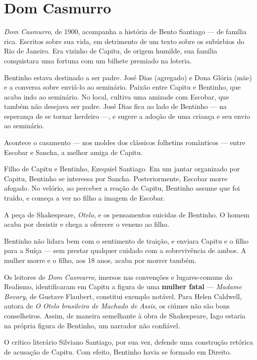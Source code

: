 
\chapter{Dom Casmurro}

\textit{Dom Casmurro}, de 1900, acompanha a história de Bento Santiago — de família rica. Escritos sobre sua vida, em detrimento de um texto sobre os subúrbios do Rio de Janeiro. Era vizinho de Capitu, de origem humilde, sua família conquistara uma fortuna com um bilhete premiado na loteria.

Bentinho estava destinado a ser padre. José Dias (agregado) e Dona Glória (mãe) e a conversa sobre enviá-lo ao seminário. Paixão entre Capitu e Bentinho, que acaba indo ao seminário. No local, cultiva uma amizade com Escobar, que também não desejava ser padre. José Dias fica ao lado de Bentinho — na esperança de se tornar herdeiro —, e sugere a adoção de uma criança e seu envio ao seminário.

Acontece o casamento — nos moldes dos clássicos folhetins românticos — entre Escobar e Sancha, a melhor amiga de Capitu.

Filho de Capitu e Bentinho, Ezequiel Santiago. Em um jantar organizado por Capitu, Bentinho se interessa por Sancha. Posteriormente, Escobar morre afogado. No velório, ao perceber a reação de Capitu, Bentinho assume que foi traído, e começa a ver no filho a imagem de Escobar.

A peça de Shakespeare, \textit{Otelo}, e os pensamentos suicidas de Bentinho. O homem acaba por desistir e chega a oferecer o veneno ao filho.

Bentinho não lidara bem com o sentimento de traição, e enviara Capitu e o filho para a Suíça — sem prestar qualquer cuidado com a sobrevivência de ambos. A mulher morre e o filho, aos 18 anos, acaba por morrer também.

Os leitores de \textit{Dom Casmurro}, imersos nas convenções e lugares-comuns do Realismo, identificaram em Capitu a figura de uma \textbf{mulher fatal} — \textit{Madame Bovary}, de Gustave Flaubert, constitui exemplo notável. Para Helen Caldwell, autora de \textit{O Otelo brasileiro de Machado de Assis}, os ciúmes não são bons conselheiros. Assim, de maneira semelhante à obra de Shakespeare, Iago estaria na própria figura de Bentinho, um narrador não confiável.

O crítico literário Silviano Santiago, por sua vez, defende uma construção retórica de acusação de Capitu. Com efeito, Bentinho havia se formado em Direito.

